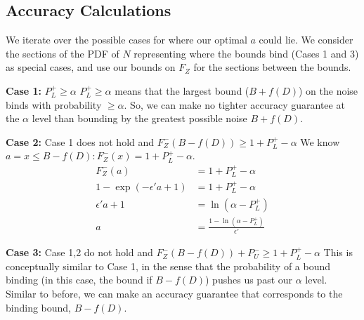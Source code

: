 \documentclass[11pt]{scrartcl} %
\begin{document}

\begin{appendices}
	\section{Accuracy Calculations}
	\label{appendix:accuracy}
	We iterate over the possible cases for where our optimal $a$ could lie.
	We consider the sections of the PDF of $N$ representing where the bounds bind (Cases 1 and 3) as special cases, and use our bounds on
	$F_{Z}$ for the sections between the bounds.

	\textbf{Case 1:} $P_{L}^{+} \geq \alpha$ \newline
	$P_{L}^{+} \geq \alpha$ means that the largest bound ($B + f(D)$) on the noise binds with probability $\geq \alpha$.
	So, we can make no tighter accuracy guarantee at the $\alpha$ level than bounding by the greatest possible noise $B + f(D)$. \newline

	\textbf{Case 2:} Case 1 does not hold and $F^{-}_{Z}(B - f(D)) \geq 1 + P_{L}^{+} - \alpha$ \newline
	We know $a = x \leq B - f(D): F_{Z}^{-}(x) = 1 + P_{L}^{+} - \alpha$.
	\begin{align}
	              	 F_{Z}^{-}(a) &= 1 + P_{L}^{+} - \alpha \nonumber \\
		1 - \exp(-\epsilon'a + 1) &= 1 + P_{L}^{+} - \alpha \nonumber \\
		           \epsilon'a + 1 &= \ln(\alpha - P_{L}^{+}) \nonumber \\
		                        a &= \frac{1 - \ln(\alpha - P_{L}^{+})}{\epsilon'} \nonumber
	\end{align}

	\textbf{Case 3:} Case 1,2 do not hold and $F^{-}_{Z}(B - f(D)) + P_{U}^{-} \geq 1 + P_{L}^{+} - \alpha$ \newline
	This is conceptually similar to Case 1, in the sense that the probability of a bound binding (in this case, the bound if $B - f(D)$) pushes us past our
	$\alpha$ level. Similar to before, we can make an accuracy guarantee that corresponds to the binding bound, $B - f(D)$. \newline


\end{appendices}
\end{document}
